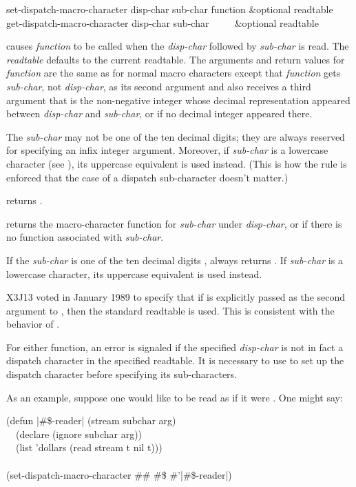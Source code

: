 \begin{defun}[Function]
set-dispatch-macro-character disp-char sub-char function &optional readtable \\
get-dispatch-macro-character disp-char sub-char ~~~~ &optional readtable

causes \emph{function} to be called when the \emph{disp-char}
followed by \emph{sub-char} is read.  The \emph{readtable} defaults to the
current readtable.  The arguments and return values for \emph{function} are
the same as for normal macro characters
except that \emph{function} gets \emph{sub-char}, not \emph{disp-char},
as its second argument and also receives a third
argument that is the non-negative integer whose decimal
representation appeared between
\emph{disp-char} and \emph{sub-char}, or {\false} if no decimal integer appeared
there.

The \emph{sub-char} may not be one of the ten decimal digits;
they are always reserved for specifying an infix integer argument.
Moreover, if \emph{sub-char} is a lowercase character
(see ), its uppercase equivalent is used instead.
(This is how the rule is enforced that the case of a dispatch sub-character
doesn't matter.)

 returns {\true}.

 returns the macro-character function
for \emph{sub-char} under \emph{disp-char}, or {\nil} if there is no
function associated with \emph{sub-char}.

If the \emph{sub-char} is one of the ten decimal digits ,
 always returns {\nil}.
If \emph{sub-char} is a lowercase character,
its uppercase equivalent is used instead.

\begin{new}
X3J13 voted in January 1989
to specify that if  is explicitly passed as the
second argument to , then the standard readtable is used.
This is consistent with the behavior of .
\end{new}

For either function,
an error is signaled if the specified \emph{disp-char} is not in fact
a dispatch character in the specified readtable.  It is necessary
to use  to set up the
dispatch character before specifying its sub-characters.

As an example, suppose one would like  to be read
as if it were .  One might say:
\begin{lisp}
(defun |\#\$-reader| (stream subchar arg) \\
~~(declare (ignore subchar arg)) \\
~~(list 'dollars (read stream t nil t))) \\
 \\
(set-dispatch-macro-character \#{\Xbackslash}\# \#{\Xbackslash}\$ \#'|\#\$-reader|)
\end{lisp}
\end{defun}

